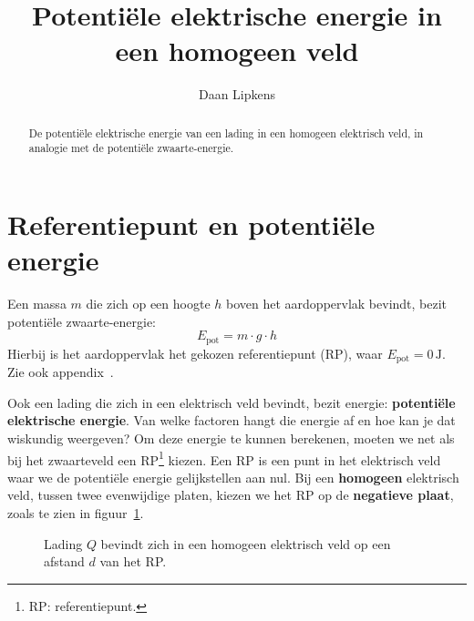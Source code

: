 \documentclass{ximera}
\title{Potentiële elektrische energie in een homogeen veld}
\author{Daan Lipkens}
\begin{document}
\begin{abstract}
    De potentiële elektrische energie van een lading in een homogeen elektrisch veld, in analogie met de potentiële zwaarte-energie.
\end{abstract}
\maketitle

\section{Referentiepunt en potentiële energie}

\begin{remark}[expandable=true,title={Herhaling: potentiële zwaarte-energie}]\nl
Een massa $m$ die zich op een hoogte $h$ boven het aardoppervlak bevindt, bezit potentiële zwaarte-energie:
\[
    E_{\text{pot}} = m \cdot g \cdot h
\]
Hierbij is het aardoppervlak het gekozen referentiepunt (RP), waar $E_{\text{pot}} = 0 \, \mathrm{J}$. Zie ook appendix~.
\end{remark}

Ook een lading die zich in een elektrisch veld bevindt, bezit energie: \textbf{potentiële elektrische energie}. Van welke factoren hangt die energie af en hoe kan je dat wiskundig weergeven? Om deze energie te kunnen berekenen, moeten we net als bij het zwaarteveld een RP\footnote{RP: referentiepunt.} kiezen.
Een RP is een punt in het elektrisch veld waar we de potentiële energie gelijkstellen aan nul.
Bij een \textbf{homogeen} elektrisch veld, tussen twee evenwijdige platen, kiezen we het RP op de \textbf{negatieve plaat}, zoals te zien in figuur~\ref{fig:rust_potentiaal}.

\begin{figure}[h]
    \captionsetup{width=0.85\textwidth}
    \begin{center}
    \end{center}
    \caption{Lading $Q$ bevindt zich in een homogeen elektrisch veld op een afstand $d$ van het RP.}
    \label{fig:rust_potentiaal}
\end{figure}
\end{document}
